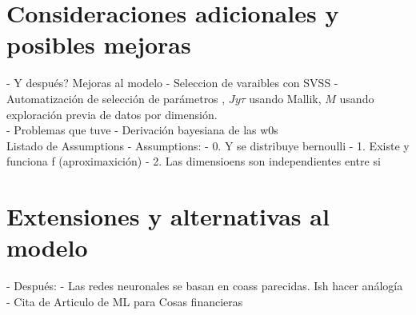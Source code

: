 \documentclass[../Main/Main.tex]{subfiles}
\begin{document}
\section{Consideraciones adicionales y posibles mejoras}
- Y después? Mejoras al modelo
- Seleccion de varaibles con SVSS
- Automatización de selección de parámetros , $J y \tau$ usando Mallik, $M$ usando exploración previa de datos por dimensión. \\

- Problemas que tuve
- Derivación bayesiana de las w0s \\

Listado de Assumptions
- Assumptions:
- 0. Y se distribuye bernoulli
- 1. Existe y funciona f (aproximaxición)
- 2. Las dimensioens son independientes entre si

\section{Extensiones y alternativas al modelo}
- Después:
- Las redes neuronales se basan en coass parecidas. Ish hacer análogía
- Cita de Articulo de ML para Cosas financieras \\
\end{document}
